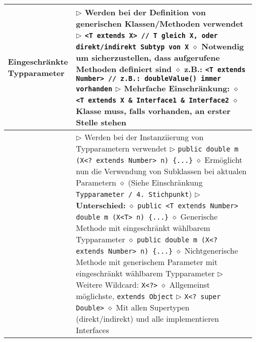 \begin{longtable}{ | p{} p{} | }
	\makecell[l]{Eingeschränkte \\ Typparameter} & \makecell[l]{
	$\rhd$ Werden bei der Definition von generischen Klassen/Methoden verwendet \\
	$\rhd$ \texttt{<T extends X> // T gleich X, oder direkt/indirekt Subtyp von X} \\
	\hspace{0.4cm} $\diamond$ Notwendig um sicherzustellen, dass aufgerufene Methoden definiert sind \\
	\hspace{0.4cm} $\diamond$ z.B.: \texttt{<T extends Number> // z.B.: doubleValue() immer vorhanden} \\
	$\rhd$ Mehrfache Einschränkung:  \\
	\hspace{0.4cm} $\diamond$ \texttt{<T extends X \& Interface1 \& Interface2} \\
	\hspace{0.4cm} $\diamond$ Klasse muss, falls vorhanden, an erster Stelle stehen} \\ \hline

	\makecell[l]{Wildcards} & \makecell[l]{
	$\rhd$ Werden bei der Instanziierung von Typparametern verwendet \\
	$\rhd$ \texttt{public double m (X<? extends Number> n) \{...\}} \\
	\hspace{0.4cm} $\diamond$ Ermöglicht nun die Verwendung von Subklassen bei aktualen Parametern \\
	\hspace{0.4cm} $\diamond$ (Siehe Einschränkung \texttt{Typparameter / 4. Stichpunkt}) \\
	$\rhd$ \textbf{Unterschied:} \\
	\hspace{0.4cm} $\diamond$ \texttt{public <T extends Number> double m (X<T> n) \{...\}} \\
	\hspace{0.6cm} $\diamond$ Generische Methode mit eingeschränkt wählbarem Typparameter \\
	\hspace{0.4cm} $\diamond$ \texttt{public double m (X<? extends Number> n) \{...\}} \\
	\hspace{0.6cm} $\diamond$ Nichtgenerische Methode mit generischem Parameter mit eingeschränkt \\
	\hspace{1cm} wählbarem Typparameter \\
	$\rhd$ Weitere Wildcard: \texttt{X<?>} \\
	\hspace{0.4cm} $\diamond$ Allgemeinst möglichste, \texttt{extends Object} \\
	$\rhd$ \texttt{X<? super Double>} \\
	\hspace{0.4cm} $\diamond$ Mit allen Supertypen (direkt/indirekt) und alle implementieren Interfaces} \\ \hline


\end{longtable}

